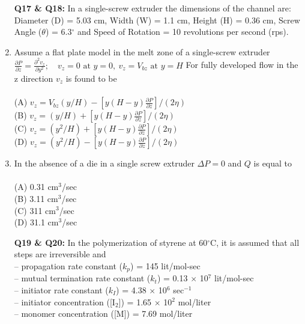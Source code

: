 \documentclass[journal,12pt,onecolumn]{IEEEtran}
\begin{document}
\begin{enumerate}[label=\arabic*)]
\newpage

\item[\textbf{Q17 \& Q18:}] In a single-screw extruder the dimensions of the channel are: Diameter (D) = 5.03 cm, Width (W) = 1.1 cm, Height (H) = 0.36 cm, Screw Angle ($\theta$) = 6.3$^\circ$ and Speed of Rotation = 10 revolutions per second (rps).\\

\item Assume a flat plate model in the melt zone of a single-screw extruder
$
\frac{\partial P}{\partial z} = \frac{\partial^2 v_z}{\partial y^2};\quad v_z = 0 \text{ at } y=0, \ v_z = V_{bz} \text{ at } y=H$
For fully developed flow in the z direction $v_z$ is found to be\\
\vspace{0.2cm}
\hfill{} \\
(A) $v_z = V_{bz}(y/H) - [y(H-y) \frac{\partial P}{\partial z}]/(2\eta)$\\
(B) $v_z = (y/H) + [y(H-y) \frac{\partial P}{\partial z}]/(2\eta)$\\
(C) $v_z = (y^2/H) + [y(H-y) \frac{\partial P}{\partial z}]/(2\eta)$\\
(D) $v_z = (y^2/H) - [y(H-y) \frac{\partial P}{\partial z}]/(2\eta)$
\vspace{0.5cm}

\item In the absence of a die in a single screw extruder $\Delta P = 0$ and $Q$ is equal to\\
\vspace{0.2cm}
\hfill{} \\
(A) 0.31 cm$^3$/sec\\
(B) 3.11 cm$^3$/sec\\
(C) 311 cm$^3$/sec\\
(D) 31.1 cm$^3$/sec
\vspace{0.5cm}

\item[\textbf{Q19 \& Q20:}] In the polymerization of styrene at 60$^\circ$C, it is assumed that all steps are irreversible and\\
-- propagation rate constant ($k_p$) = 145 lit/mol-sec\\
-- mutual termination rate constant ($k_t$) = 0.13 $\times$ 10$^7$ lit/mol-sec\\
-- initiator rate constant ($k_I$) = 4.38 $\times$ 10$^6$ sec$^{-1}$\\
-- initiator concentration ([I$_2$]) = 1.65 $\times$ 10$^2$ mol/liter\\
-- monomer concentration ([M]) = 7.69 mol/liter\\


\end{enumerate}
\end{document}
